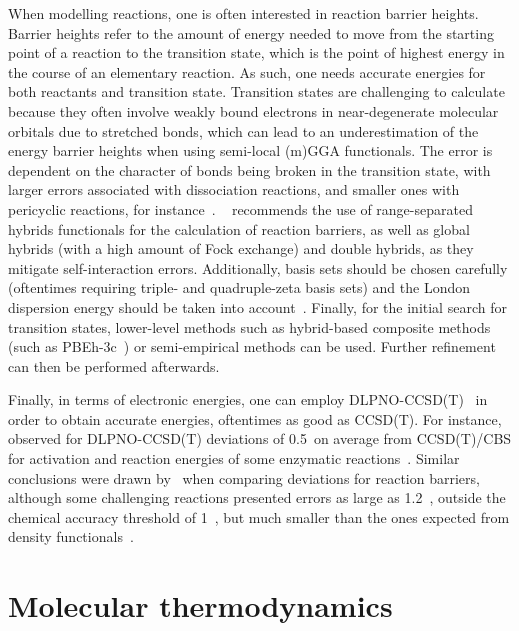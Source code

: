 When modelling reactions,
one is often interested in reaction barrier heights.
Barrier heights refer to the amount of energy needed to move from the starting point of a reaction to the transition state,
which is the point of highest energy in the course of an elementary reaction.
As such,
one needs accurate energies for both reactants and transition state.
Transition states are challenging to calculate because they often involve weakly bound electrons
in near-degenerate molecular orbitals
due to stretched bonds,
which can lead to an underestimation of the energy barrier heights when using semi-local (m)GGA functionals.
The error is dependent on the character of bonds being broken in the transition state,
with larger errors associated with dissociation reactions,
and smaller ones with pericyclic reactions,
for instance~\cite{Bursch_2022}.
\citeauthor{Bursch_2022}~\cite{Bursch_2022} recommends the use of range-separated hybrids functionals for the calculation of reaction barriers,
as well as global hybrids (with a high amount of Fock exchange) and double hybrids,
as they mitigate self-interaction errors.
Additionally,
basis sets should be chosen carefully (oftentimes requiring triple- and quadruple-zeta basis sets) and the London dispersion energy should be taken into account~\cite{Bursch_2022}.
Finally,
for the initial search for transition states,
lower-level methods such as hybrid-based composite methods (such as PBEh-3c~\cite{Grimme_2015}) or semi-empirical methods can be used.
Further refinement can then be performed afterwards.

Finally,
in terms of electronic energies,
one can employ DLPNO-CCSD(T)~\cite{Riplinger_2013,Riplinger_2016}
in order to obtain accurate energies,
oftentimes
as good as CCSD(T).
For instance,~\cite{Paiva_2020} observed for DLPNO-CCSD(T)
deviations of 0.5~\kcalmol on average from CCSD(T)/CBS for
activation and reaction energies of some enzymatic reactions~\cite{Paiva_2020}.
Similar conclusions were drawn by~\cite{Sandler_2021}
when comparing deviations for reaction barriers,
although
some challenging reactions presented errors as large as 1.2~\kcalmol,
outside the chemical accuracy threshold of 1~\kcalmol,
but
much smaller than the ones expected from density functionals~\cite{Sandler_2021}.

\section{Molecular thermodynamics}%
\label{sec:mol-thermo}

